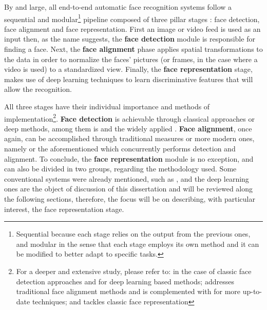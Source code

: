 \documentclass[class=report, crop=false, a4paper, 12pt]{standalone}
\begin{document}
\par By and large, all end-to-end automatic face recognition systems follow a sequential and modular\footnote{Sequential because each stage relies on the output from the previous ones, and modular in the sense that each stage employs its own method and it can be modified to better adapt to specific tasks.} pipeline  composed of three pillar stages \autocite{wangDeepFaceRecognition2021}: face detection, face alignment and face representation. First an image or video feed is used as an input then, as the name suggests, the \textbf{face detection} module is responsible for finding a face. Next, the \textbf{face alignment} phase applies spatial transformations to the data in order to normalize the faces' pictures (or frames, in the case where a video is used) to a standardized view. Finally, the \textbf{face representation} stage, makes use of deep learning techniques to learn discriminative features that will allow the recognition.

\par All three stages have their individual importance and methods of implementation\footnote{For a deeper and extensive study, please refer to: \autocite{zafeiriouSurveyFaceDetection2015} in the case of classic face detection approaches and \autocite{minaeeGoingDeeperFace2021} for deep learning based methods; \autocite{wangFacialFeaturePoint2018} addresses traditional face alignment methods and is complemented with \autocite{duElementsEndtoendDeep2022} for more up-to-date techniques; and \autocite{learned-millerLabeledFacesWild2016} tackles classic face representation }. \textbf{Face detection} is achievable through classical approaches \autocite{violaRapidObjectDetection2001, brubakerDesignCascadesBoosted2008} or deep methods, among them is \autocite{dengRetinaFaceSinglestageDense2019} and the widely applied \autocite{zhangJointFaceDetection2016a}. \textbf{Face alignment}, once again, can be accomplished through traditional measures \autocite{cootesViewbasedActiveAppearance2002, martinezLocalEvidenceAggregation2013} or more modern ones, namely \autocite{huangPropagationNetPropagatePoints2020} or the aforementioned \autocite{zhangJointFaceDetection2016a} which concurrently performs detection and alignment. To conclude, the \textbf{face representation} module is no exception, and can also be divided in two groups, regarding the methodology used. Some conventional systems were already mentioned, such as \autocite{p.n.belhumeurEigenfacesVsFisherfaces1997,turkEigenfacesRecognition1991}, and the deep learning ones are the object of discussion of this dissertation and will be reviewed along the following sections, therefore, the focus will be on describing, with particular interest, the face representation stage.
\end{document}
